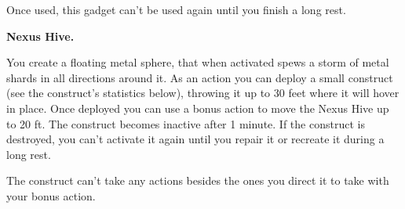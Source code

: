 \documentclass[11pt,twoside,openany]{book}  %
\begin{document}
\begin{fiveitemize}
	Once used, this gadget can’t be used again until you finish a long rest.

	\item \textbf{Nexus Hive.}
	
	You create a floating metal sphere, that when activated spews a storm of metal shards in all directions around it. As an action you can deploy a small construct (see the construct’s statistics below), throwing it up to 30 feet where it will hover in place. Once deployed you can use a bonus action to move the Nexus Hive up to 20 ft. The construct becomes inactive after 1 minute.
	If the construct is destroyed, you can’t activate it again until you repair it or recreate it during a long rest.

	The construct can’t take any actions besides the ones you direct it to take with your bonus action.
\end{fiveitemize}
\end{document}
